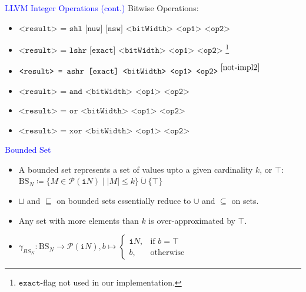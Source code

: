 \begin{frame}[fragile]{\textcolor{blue}{LLVM Integer Operations (cont.)}}
Bitwise Operations:
\begin{itemize}
\item $\texttt{<result> = shl [nuw] [nsw] <bitWidth> <op1> <op2>}$
\item $\texttt{<result> = lshr [exact] <bitWidth> <op1> <op2>}$ \footnote{\label{not-impl2} $\texttt{exact}$-flag not used in our implementation.}
\item $\texttt{<result> = ashr [exact] <bitWidth> <op1> <op2>}^{~\ref{not-impl2}}$
\item $\texttt{<result> = and <bitWidth> <op1> <op2>}$
\item $\texttt{<result> = or <bitWidth> <op1> <op2>}$
\item $\texttt{<result> = xor <bitWidth> <op1> <op2>}$
\end{itemize}

\end{frame}

\begin{frame}[fragile]{\textcolor{blue}{Bounded Set}}
\begin{itemize}
\item A bounded set represents a set of values upto a given cardinality $k$, or $\top$: \\
$\mathrm{BS}_{N} \coloneqq \{M\in \mathcal{P}(\texttt{i}N)\mid |M| \leq k\} \dot\cup \{ \top \}$ \\
\item $\sqcup$ and $\sqsubseteq$ on bounded sets essentially reduce to $\cup$ and $\subseteq$ on sets.
\item Any set with more elements than $k$ is over-approximated by $\top$.
\item $\gamma_{BS_N} \colon \mathrm{BS}_N \rightarrow \mathcal{P}(\texttt{i}N),
b \mapsto
\begin{cases}
\texttt{i}N,  & \text{if }b=\top \\
b, & \text{otherwise}
\end{cases}
$ 

\end{itemize}

\end{frame}


